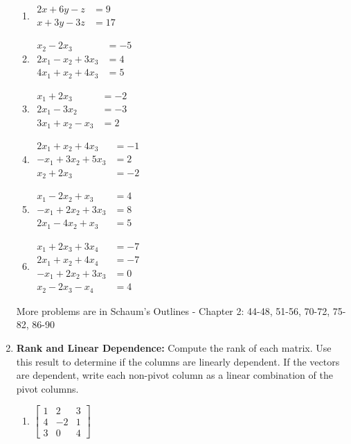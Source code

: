 \begin{enumerate}
\begin{multicols}{3}
\begin{enumerate}
	\item 
$
\begin{array}{rl}
 2x+ 6y -z &= 9 \\
 x+ 3y -3z &= 17
\end{array}
$


	\item 
$
\begin{array}{rl}
  x_2 -2x_3 &= -5 \\
 2x_1 -x_2 + 3x_3 &= 4 \\
 4x_1 +x_2 + 4x_3 &= 5
\end{array}
$


	\item 
$
\begin{array}{rl}
 x_1 + 2x_3 &= -2 \\
 2x_1  -3x_2  &= -3 \\
 3x_1 +x_2 -x_3 &= 2
\end{array}
$


	\item 
$
\begin{array}{rl}
 2x_1 +x_2 + 4x_3 &= -1 \\
 -x_1 + 3x_2 + 5x_3 &= 2 \\
 x_2 + 2x_3 &= -2
\end{array}
$


	\item 
$
\begin{array}{rl}
 x_1 -2x_2 +x_3 &= 4 \\
 -x_1 + 2x_2 + 3x_3 &= 8 \\
 2x_1  -4x_2 +x_3 &= 5
\end{array}
$


	\item 
$
\begin{array}{rl}
 x_1 + 2x_3 + 3x_4 &= -7 \\
 2x_1 +x_2 + 4x_4 &= -7 \\
 -x_1 + 2x_2 + 3x_3  &= 0 \\
 x_2  -2x_3  -x_4 &= 4
\end{array}
$
\end{enumerate}
\end{multicols}

More problems are in Schaum's Outlines - 
Chapter 2:
44-48, 51-56, 70-72, 75-82, 86-90 


\item \textbf{Rank and Linear Dependence:} Compute the rank of each matrix. Use this result to determine if the columns are linearly dependent. If the vectors are dependent, write each non-pivot column as a linear combination of the pivot columns.
\begin{multicols}{4}
\begin{enumerate}
	\item \label{rank1} 
$
\begin{bmatrix}
 1 & 2 & 3 \\
 4 & -2 & 1 \\
 3 & 0 & 4
\end{bmatrix}
$


\end{enumerate}
\end{multicols}
\end{enumerate}
